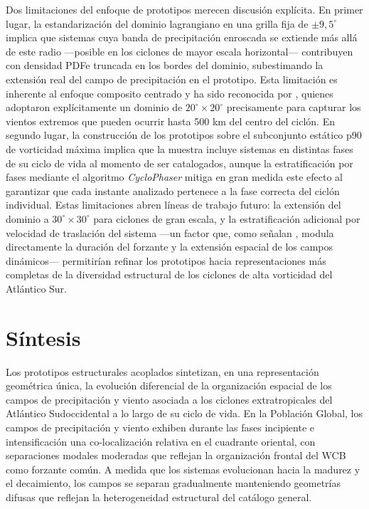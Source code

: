 Dos limitaciones del enfoque de prototipos merecen discusión explícita. En primer lugar, la estandarización del dominio lagrangiano en una grilla fija de $\pm 9{,}5^{\circ}$ implica que sistemas cuya banda de precipitación enroscada se extiende más allá de este radio —posible en los ciclones de mayor escala horizontal— contribuyen con densidad PDFe truncada en los bordes del dominio, subestimando la extensión real del campo de precipitación en el prototipo. Esta limitación es inherente al enfoque composito centrado y ha sido reconocida por \citet{cardoso2022synoptic}, quienes adoptaron explícitamente un dominio de $20^{\circ} \times 20^{\circ}$ precisamente para capturar los vientos extremos que pueden ocurrir hasta 500 km del centro del ciclón. En segundo lugar, la construcción de los prototipos sobre el subconjunto estático p90 de vorticidad máxima implica que la muestra incluye sistemas en distintas fases de su ciclo de vida al momento de ser catalogados, aunque la estratificación por fases mediante el algoritmo \textit{CycloPhaser} \citep{deSouza2025CycloPhaser} mitiga en gran medida este efecto al garantizar que cada instante analizado pertenece a la fase correcta del ciclón individual. Estas limitaciones abren líneas de trabajo futuro: la extensión del dominio a $30^{\circ} \times 30^{\circ}$ para ciclones de gran escala, y la estratificación adicional por velocidad de traslación del sistema —un factor que, como señalan \citet{gramcianinov2023impact}, modula directamente la duración del forzante y la extensión espacial de los campos dinámicos— permitirían refinar los prototipos hacia representaciones más completas de la diversidad estructural de los ciclones de alta vorticidad del Atlántico Sur.

\section{Síntesis}\label{sec:sintesis_prototipos}

Los prototipos estructurales acoplados sintetizan, en una representación geométrica única, la evolución diferencial de la organización espacial de los campos de precipitación y viento asociada a los ciclones extratropicales del Atlántico Sudoccidental a lo largo de su ciclo de vida. En la Población Global, los campos de precipitación y viento exhiben durante las fases incipiente e intensificación una co-localización relativa en el cuadrante oriental, con separaciones modales moderadas que reflejan la organización frontal del WCB como forzante común. A medida que los sistemas evolucionan hacia la madurez y el decaimiento, los campos se separan gradualmente manteniendo geometrías difusas que reflejan la heterogeneidad estructural del catálogo general.

